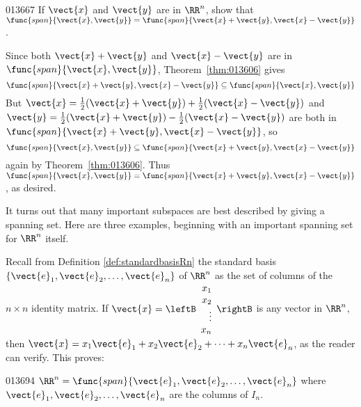 \begin{example}{}{013667}
If $\vect{x}$ and $\vect{y}$ are in $\RR^n$, show that $\func{span}\{\vect{x}, \vect{y}\} = \func{span}\{\vect{x} + \vect{y}, \vect{x} - \vect{y}\}$.

\begin{solution}
Since both $\vect{x} + \vect{y}$ and $\vect{x} - \vect{y}$ are in $\func{span}\{\vect{x}, \vect{y}\}$, Theorem~\ref{thm:013606} gives
\begin{equation*}
\func{span}\{\vect{x} + \vect{y}, \vect{x} - \vect{y} \} \subseteq \func{span}\{\vect{x}, \vect{y}\}
\end{equation*}
But $\vect{x} = \frac{1}{2}(\vect{x} + \vect{y}) + \frac{1}{2}(\vect{x} - \vect{y})$ and $\vect{y} = \frac{1}{2}(\vect{x} + \vect{y}) - \frac{1}{2}(\vect{x} - \vect{y})$ are both in $\func{span}\{\vect{x} + \vect{y}, \vect{x} - \vect{y}\}$, so
\begin{equation*}
\func{span}\{\vect{x}, \vect{y}\} \subseteq \func{span}\{\vect{x} + \vect{y}, \vect{x} - \vect{y} \}
\end{equation*}
again by Theorem~\ref{thm:013606}. Thus $\func{span}\{\vect{x}, \vect{y}\} = \func{span}\{\vect{x} + \vect{y}, \vect{x} - \vect{y}\}$, as desired.
\end{solution}
\end{example}

It turns out that many important subspaces are best described by giving a spanning set. Here are three examples, beginning with an important spanning set for $\RR^n$ itself. 

Recall from Definition \ref{def:standardbasisRn} the standard basis   $\{\vect{e}_{1}, \vect{e}_{2}, \dots, \vect{e}_{n}\}$ of  $\RR^n$ as the set of columns of the $n \times n$ identity matrix. 
If $ \vect{x} = 
	\leftB \begin{array}{r}
	x_1 \\
	x_2 \\
	\vdots \\
	x_n
	\end{array} \rightB $
 is any vector in $\RR^n$, then $\vect{x} = x_{1}\vect{e}_{1} + x_{2}\vect{e}_{2} + \dots + x_{n}\vect{e}_{n}$, as the reader can verify. This proves:

\begin{example}{}{013694}
$\RR^n = \func{span}\{\vect{e}_{1}, \vect{e}_{2}, \dots, \vect{e}_{n}\}$ where $\vect{e}_{1}, \vect{e}_{2}, \dots, \vect{e}_{n}$ are the columns of $I_{n}$.
\end{example}

